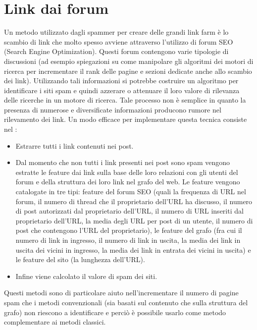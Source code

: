 \section{Link dai forum}
Un metodo utilizzato dagli spammer per creare delle grandi link farm è lo scambio di link che molto spesso avviene attraverso l'utilizzo di forum SEO (Search Engine Optimization). Questi forum contengono varie tipologie di discussioni  (ad esempio spiegazioni su come manipolare gli algoritmi dei motori di ricerca per incrementare il rank delle pagine e sezioni dedicate anche allo scambio dei link). Utilizzando tali informazioni si potrebbe costruire un algoritmo per identificare i siti spam e quindi azzerare o attenuare il loro valore di rilevanza delle ricerche in un motore di ricerca. Tale processo non è semplice in quanto la presenza di numerose e diversificate informazioni producono rumore nel rilevamento dei link. Un modo efficace per implementare questa tecnica consiste nel  \cite{Cheng:2011:LWS:1935826.1935902}: 
\begin{itemize}
 \item Estrarre tutti i link contenuti nei post.
 \item Dal momento che non tutti i link presenti nei post sono spam vengono estratte le feature dai link sulla base delle loro relazioni con gli utenti del forum e della struttura dei loro link nel grafo del web. Le feature vengono catalogate in tre tipi: feature del forum SEO (quali la frequenza di URL nel forum, il numero di thread che il proprietario dell'URL ha discusso, il numero di post autorizzati dal proprietario dell'URL, il numero di URL inseriti dal proprietario dell'URL, la media degli URL per post di un utente, il numero di post che contengono l'URL del proprietario), le feature del grafo (fra cui il numero di link in ingresso, il numero di link in uscita, la media dei link in uscita dei vicini in ingresso, la media dei link in entrata dei vicini in uscita) e le feature del sito (la lunghezza dell'URL). 
 \item Infine viene calcolato il valore di spam dei siti.
\end{itemize}
Questi metodi sono di particolare aiuto nell'incrementare il numero di pagine spam che i metodi convenzionali (sia basati sul contenuto che sulla struttura del grafo) non riescono a identificare  e perciò è possibile usarlo come metodo complementare ai metodi classici. 


